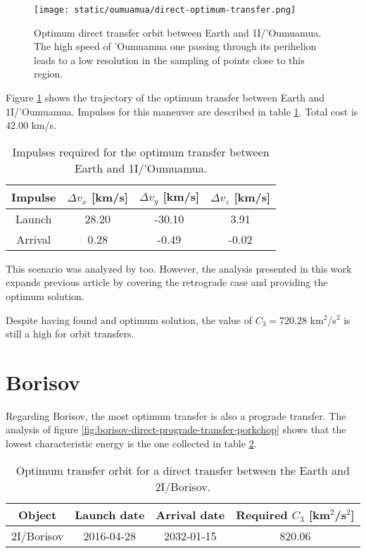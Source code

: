 \begin{figure}[H]
  \centering
  \texttt{[image: static/oumuamua/direct-optimum-transfer.png]}
  \caption{Optimum direct transfer orbit between Earth and 1I/'Oumuamua. The
    high speed of 'Oumuamua one passing through its perihelion leads to a low
    resolution in the sampling of points close to this region.}
  \label{fig:oumuamua-direct-transfer-orbit}
\end{figure}

Figure \ref{fig:oumuamua-direct-transfer-orbit} shows the trajectory of the
optimum transfer between Earth and 1I/'Oumuamua. Impulses for this maneuver are
described in table \ref{tab:oumuamua-direct-transfer-impulses}. Total cost is
$42.00$ km/s.

\begin{table}[H]
  \centering
  \begin{tabular}{|c|c|c|c|}
    \hline
    Impulse & $\Delta v_x$ [km/s] & $\Delta v_y$ [km/s] & $\Delta v_z$ [km/s] \\
    \hline
    Launch & 28.20 & -30.10 & 3.91 \\
    \hline
    Arrival & 0.28 & -0.49 & -0.02 \\
    \hline
  \end{tabular}
  \caption{Impulses required for the optimum transfer between Earth and 1I/'Oumuamua.}
  \label{tab:oumuamua-direct-transfer-impulses}
\end{table}

This scenario was analyzed by \cite{hein2018} too. However, the analysis
presented in this work expands previous article by covering the retrograde case
and providing the optimum solution.

Despite having found and optimum solution, the value of $C_3 = 720.28$
km$^2$/s$^2$ is still a high for orbit transfers.

\section{Borisov}

Regarding Borisov, the most optimum transfer is also a prograde transfer. The
analysis of figure \ref{fig:borisov-direct-prograde-transfer-porkchop} shows
that the lowest characteristic energy is the one collected in table
\ref{tab:borisov-direct-transfer-optimum}.

\vspace{1cm}
\begin{table}[H]
  \centering
  \begin{tabular}{|c|c|c|c|}
    \hline
    Object & Launch date & Arrival date & Required $C_3$ [km$^2$/s$^2$] \\
    \hline
    2I/Borisov & 2016-04-28 & 2032-01-15 & 820.06 \\
    \hline
  \end{tabular}
  \caption{Optimum transfer orbit for a direct transfer between the Earth and 2I/Borisov.}
  \label{tab:borisov-direct-transfer-optimum}
\end{table}

